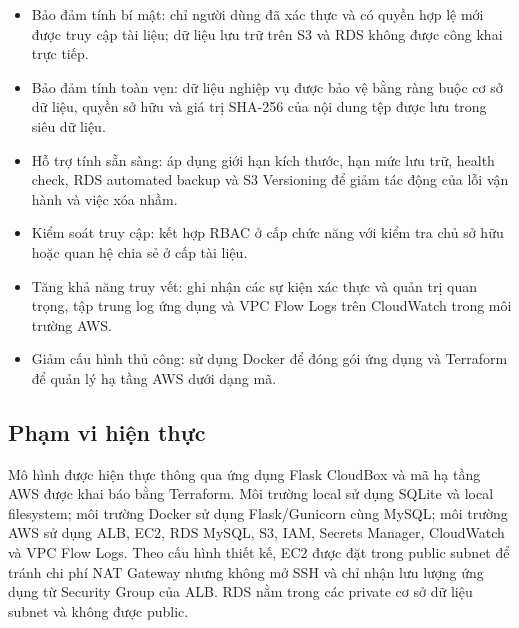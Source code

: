 \begin{itemize}
    \item Bảo đảm tính bí mật:
    chỉ người dùng đã xác thực và có quyền hợp lệ mới được
    truy cập tài liệu; dữ liệu lưu trữ trên S3 và RDS không
    được công khai trực tiếp.

    \item Bảo đảm tính toàn vẹn:
    dữ liệu nghiệp vụ được bảo vệ bằng ràng buộc cơ sở dữ liệu,
    quyền sở hữu và giá trị SHA-256 của nội dung tệp được
    lưu trong siêu dữ liệu.

    \item Hỗ trợ tính sẵn sàng:
    áp dụng giới hạn kích thước, hạn mức lưu trữ, health check,
    RDS automated backup và S3 Versioning để giảm tác động
    của lỗi vận hành và việc xóa nhầm.

    \item Kiểm soát truy cập:
    kết hợp RBAC ở cấp chức năng với kiểm tra chủ sở hữu
    hoặc quan hệ chia sẻ ở cấp tài liệu.

    \item Tăng khả năng truy vết:
    ghi nhận các sự kiện xác thực và quản trị quan trọng,
    tập trung log ứng dụng và VPC Flow Logs trên CloudWatch
    trong môi trường AWS.

    \item Giảm cấu hình thủ công:
    sử dụng Docker để đóng gói ứng dụng và Terraform để
    quản lý hạ tầng AWS dưới dạng mã.
\end{itemize}

\subsection{Phạm vi hiện thực}

Mô hình được hiện thực thông qua ứng dụng Flask CloudBox
và mã hạ tầng AWS được khai báo bằng Terraform.
Môi trường local sử dụng SQLite và local filesystem;
môi trường Docker sử dụng Flask/Gunicorn cùng MySQL;
môi trường AWS sử dụng ALB, EC2, RDS MySQL, S3, IAM,
Secrets Manager, CloudWatch và VPC Flow Logs.
Theo cấu hình thiết kế, EC2 được đặt trong public subnet
để tránh chi phí NAT Gateway nhưng không mở SSH và chỉ
nhận lưu lượng ứng dụng từ Security Group của ALB.
RDS nằm trong các private cơ sở dữ liệu subnet và không
được public.

